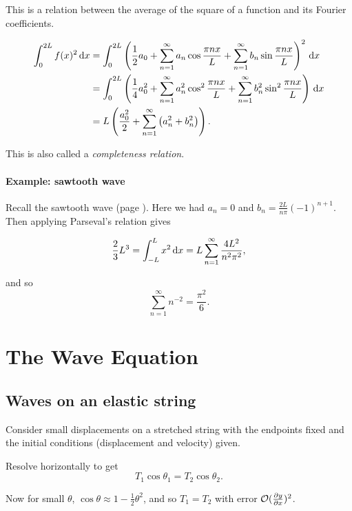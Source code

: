 \documentclass{notes}
\theoremstyle{plain}
\newcommand{\cO}{\mathcal{O}}
\begin{document}
This is a relation between the average of the square of a function and
its Fourier coefficients.

\begin{align*}
  \int_0^{2 L} f(x)^2\, \mathrm{d} x &= \int_0^{2 L} \left(\frac{1}{2} a_0 +
    \sum_{n=1}^\infty a_n \cos \frac{\pi n x}{L} + \sum_{n=1}^\infty
    b_n \sin \frac{\pi n x}{L} \right)^2 \, \mathrm{d} x \\
  &= \int_0^{2 L} \left( \frac{1}{4} a_0^2
  + \sum_{n=1}^\infty a_n^2 \cos^2 \frac{\pi n x}{L} + \sum_{n=1}^\infty
    b_n^2 \sin^2 \frac{\pi n x}{L} \right)\, \mathrm{d} x \\
  &= L \left(\frac{a_0^2}{2} +
    \sum_{n=1}^\infty \left(a_n^2 + b_n^2\right) \right).
\end{align*}

This is also called a \emph{completeness relation}.

\subsubsection*{Example: sawtooth wave}

Recall the sawtooth wave (page \pageref{ref:sawtooth}).  Here we had
$a_n = 0$ and $b_n = \frac{2 L}{n \pi} (-1)^{n+1}$.  Then applying
Parseval's relation gives

\[
\frac{2}{3} L^3 = \int_{-L}^L x^2\, \mathrm{d} x =
L \sum_{n=1}^\infty \frac{4 L^2}{n^2 \pi^2},
\]

and so
\[
\sum_{n=1}^\infty n^{-2} = \frac{\pi^2}{6}.
\]

\chapter{The Wave Equation}

\section{Waves on an elastic string}

Consider small displacements on a stretched string with the endpoints
fixed and the initial conditions (displacement and velocity) given.

\vspace{1.5in}

Resolve horizontally to get
\[
T_1 \cos \theta_1 = T_2 \cos \theta_2.
\]

Now for small $\theta$, $\cos \theta \approx 1 - \frac{1}{2}
\theta^2$, and so $T_1 = T_2$ with error $\cO(\pd{y}{x})^2$.  
\end{document}
